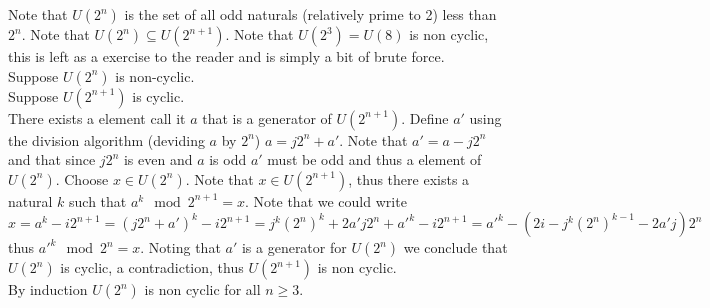 \documentclass[12pt]{article}
\makeatletter
\theoremstyle{homework}
\newenvironment{exercise}[1]
{\def\@currentlabel{#1}\exercisecore}
{\endexercisecore}
\makeatother
\begin{document}
\begin{exercise}
{4.66}
Note that $U(2^n)$ is the set of all odd naturals (relatively prime to 2) less than $2^n$.  Note that $U(2^n)\subseteq U(2^{n+1})$.  Note that $U(2^3)=U(8)$ is non cyclic, this is left as a exercise to the reader and is simply a bit of brute force.\\
Suppose $U(2^n)$ is non-cyclic.\\
Suppose $U(2^{n+1})$ is cyclic.\\
There exists a element call it $a$ that is a generator of $U(2^{n+1})$.  Define $a'$ using the division algorithm (deviding $a$ by $2^n$) $a=j2^n+a'$.  Note that $a'=a-j2^n$ and that since $j2^n$ is even and $a$ is odd $a'$ must be odd and thus a element of $U(2^n)$.  Choose $x\in U(2^n)$.  Note that $x\in U(2^{n+1})$, thus there exists a natural $k$ such that $a^k\mod 2^{n+1}=x$.  Note that we could write $x=a^k-i2^{n+1}=(j2^n+a')^k-i2^{n+1}=j^k(2^n)^k+2a'j2^n+a'^k-i2^{n+1}=a'^k-(2i-j^k(2^n)^{k-1}-2a'j)2^n$ thus $a'^k\mod 2^n=x$.  Noting that $a'$ is a generator for $U(2^n)$ we conclude that $U(2^n)$ is cyclic, a contradiction, thus $U(2^{n+1})$ is non cyclic.\\
By induction $U(2^n)$ is non cyclic for all $n\geq 3$.
\end{exercise}
\end{document}
